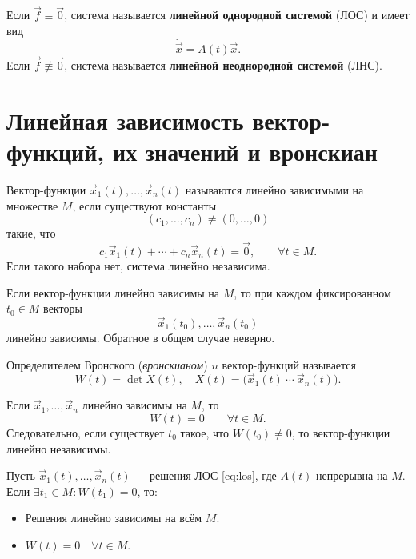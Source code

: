 \documentclass[12pt,a4paper]{article}
\numberwithin{equation}{section}
\newcommand{\vect}[1]{\vec{#1}}
\DeclareRobustCommand{\examtag}[1]{\space{\normalfont\small\color{HSEgray}(#1)}}
\begin{document}
\begin{definitionHSE}
Если $\vect f\equiv\vect 0$, система называется \textbf{линейной однородной
системой} (ЛОС) и имеет вид
\begin{equation}
 \dot{\vect{x}}=A(t)\vect{x}.
 \label{eq:los}
\end{equation}
Если $\vect f\not\equiv\vect 0$, система называется
\textbf{линейной неоднородной системой} (ЛНС).
\end{definitionHSE}

\section[Линейная зависимость и вронскиан\examtag{вопрос~13}]{Линейная зависимость вектор-функций, их значений и вронскиан\examtag{вопрос~13}}

\begin{definitionHSE}
Вектор-функции $\vect{x}_1(t),\ldots,\vect{x}_n(t)$ называются линейно зависимыми на множестве $M$, если существуют константы
\[
(c_1,\ldots,c_n)\neq(0,\ldots,0)
\]
такие, что
\[
c_1\vect{x}_1(t)+\cdots+c_n\vect{x}_n(t)=\vect{0},
\qquad \forall t\in M.
\]
Если такого набора нет, система линейно независима.
\end{definitionHSE}

\begin{lemmaHSE}
Если вектор-функции линейно зависимы на $M$, то при каждом фиксированном $t_0\in M$ векторы
\[
\vect{x}_1(t_0),\ldots,\vect{x}_n(t_0)
\]
линейно зависимы. Обратное в общем случае неверно.
\end{lemmaHSE}

\begin{definitionHSE}
Определителем Вронского (\textit{вронскианом}) $n$ вектор-функций называется
\[
W(t)=\det X(t),
\quad
X(t)=\bigl(\vect{x}_1(t)\ \cdots\ \vect{x}_n(t)\bigr).
\]
\end{definitionHSE}

\begin{corollaryHSE}
Если $\vect{x}_1,\ldots,\vect{x}_n$ линейно зависимы на $M$, то
\[
W(t)=0\qquad \forall t\in M.
\]
Следовательно, если существует $t_0$ такое, что $W(t_0)\neq0$, то вектор-функции линейно независимы.
\end{corollaryHSE}

\begin{lemmaHSE}
Пусть $\vect{x}_1(t),\ldots,\vect{x}_n(t)$ --- решения ЛОС \eqref{eq:los}, где $A(t)$ непрерывна на $M$. Если \(\exists t_1\in M:W(t_1)=0\), то:
\begin{itemize}
\item Решения линейно зависимы на всём $M$.
\item \(W(t)=0\quad\forall t\in M.\)
\end{itemize}
\end{lemmaHSE}
\end{document}
